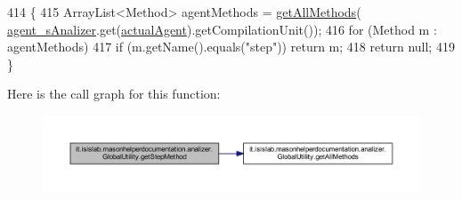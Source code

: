 \begin{DoxyCode}
414                                         \{
415         ArrayList<Method> agentMethods = \hyperlink{classit_1_1isislab_1_1masonhelperdocumentation_1_1analizer_1_1_global_utility_aaa103a9dda7ed0230fd1f8d65d4cc5d4}{getAllMethods}(
      \hyperlink{classit_1_1isislab_1_1masonhelperdocumentation_1_1analizer_1_1_global_utility_a82af8b91f98c70ad25d504cc16e424b9}{agent\_sAnalizer}.get(\hyperlink{classit_1_1isislab_1_1masonhelperdocumentation_1_1analizer_1_1_global_utility_a8106b6699b9c7834ead4fc38d62a2575}{actualAgent}).getCompilationUnit());
416         \textcolor{keywordflow}{for} (Method m : agentMethods)
417             \textcolor{keywordflow}{if} (m.getName().equals(\textcolor{stringliteral}{"step"})) \textcolor{keywordflow}{return} m;
418         \textcolor{keywordflow}{return} null;
419     \}
\end{DoxyCode}


Here is the call graph for this function\-:\nopagebreak
\begin{figure}[H]
\begin{center}
\leavevmode
\includegraphics[width=350pt]{classit_1_1isislab_1_1masonhelperdocumentation_1_1analizer_1_1_global_utility_ab8caf9838cc1fb62385c3a680b1a4e0f_cgraph}
\end{center}
\end{figure}


